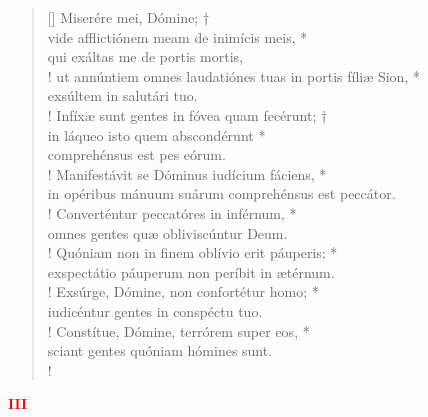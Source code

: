 \begin{verse}[\versewidth]
Miserére mei, Dómine; †\\
vide afflictiónem meam de inimícis meis, *\\
qui exáltas me de portis mortis,\\!
\vin ut annúntiem \verselinebreak omnes laudatiónes tuas in portis fíliæ Sion, *\\
\vin exsúltem in salutári tuo.\\!
Infíxæ sunt gentes in fóvea quam fecérunt; †\\
in láqueo isto quem abscondérunt *\\
comprehénsus est pes eórum.\\!
\vin Manifestávit se Dóminus iudícium fáciens, *\\
\vin in opéribus mánuum suárum comprehénsus est peccátor.\\!
Converténtur peccatóres in inférnum, *\\
omnes gentes quæ obliviscúntur Deum.\\!
\vin Quóniam non in finem oblívio erit páuperis; *\\
\vin exspectátio páuperum non períbit in ætérnum.\\!
Exsúrge, Dómine, non confortétur homo; *\\
iudicéntur gentes in conspéctu tuo.\\!
\vin Constítue, Dómine, terrórem super eos, *\\
\vin sciant gentes quóniam hómines sunt.\\!
\end{verse}
\begin{center}
\textcolor{red}{\bf III}\\
\end{center}
